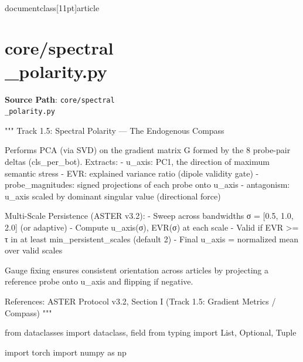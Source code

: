 \\documentclass[11pt]{article}
\begin{document}
\section*{core/spectral\\_polarity.py}
\textbf{Source Path}: \texttt{core/spectral\\_polarity.py}\par
\bigskip
\begin{CodeBlock}
"""
Track 1.5: Spectral Polarity — The Endogenous Compass

Performs PCA (via SVD) on the gradient matrix G formed by the 8 probe-pair
deltas (cls_per_bot). Extracts:
  - u_axis:  PC1, the direction of maximum semantic stress
  - EVR:     explained variance ratio (dipole validity gate)
  - probe_magnitudes:  signed projections of each probe onto u_axis
  - antagonism:  u_axis scaled by dominant singular value (directional force)

Multi-Scale Persistence (ASTER v3.2):
  - Sweep across bandwidths σ = [0.5, 1.0, 2.0] (or adaptive)
  - Compute u_axis(σ), EVR(σ) at each scale
  - Valid if EVR >= τ in at least min_persistent_scales (default 2)
  - Final u_axis = normalized mean over valid scales

Gauge fixing ensures consistent orientation across articles by projecting
a reference probe onto u_axis and flipping if negative.

References:
  ASTER Protocol v3.2, Section I (Track 1.5: Gradient Metrics / Compass)
"""

from dataclasses import dataclass, field
from typing import List, Optional, Tuple

import torch
import numpy as np



\end{CodeBlock}
\end{document}
